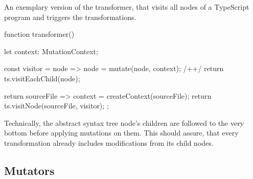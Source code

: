 \begin{program}
\caption{An exemplary version of the transformer, that visits all nodes of a TypeScript program and triggers the transformations.}
\label{prog:transformer}
\begin{JsCode}
function transformer() {
  let context: MutationContext;
  
  const visitor = node => {
    node = mutate(node, context); /+\label{prog:transformer:mutate}+/
    return ts.visitEachChild(node);
  }
  
  return sourceFile => {
    context = createContext(sourceFile);
    return ts.visitNode(sourceFile, visitor);
  };
}
\end{JsCode}
\end{program}
Technically, the abstract syntax tree node's children are followed to the very bottom before applying mutations on them. This should assure, that every transformation already includes modifications from its child nodes.


\subsection{Mutators}
\label{sec:mutators}

